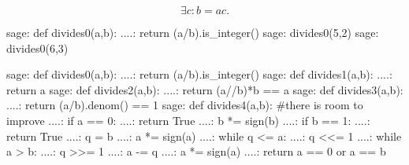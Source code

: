 \begin{definition}[\Wrap{content/magyar=Osztó, content/english=Divisor}]
  \[ \exists c: b = ac.\]
\end{definition}

\begin{exercise}
  \begin{sageexample}
    sage: def divides0(a,b):
    ....:     return (a/b).is_integer()
    sage: divides0(5,2)
    sage: divides0(6,3)
  \end{sageexample}

  \begin{solution}
    \begin{sageexample}
        sage: def divides0(a,b):
        ....:     return (a/b).is_integer()
        sage: def divides1(a,b):
        ....:     return a %
        sage: def divides2(a,b):
        ....:     return (a//b)*b == a
        sage: def divides3(a,b):
        ....:     return (a/b).denom() == 1
        sage: def divides4(a,b): #there is room to improve
        ....:     if a == 0:
        ....:         return True
        ....:     b *= sign(b)
        ....:     if b == 1:
        ....:         return True
        ....:     q = b
        ....:     a *= sign(a)
        ....:     while q <= a:
        ....:         q <<= 1
        ....:     while a > b:
        ....:         q >>= 1
        ....:         a -= q
        ....:         a *= sign(a)
        ....:     return a == 0 or a == b

      \end{sageexample}
  \end{solution}
\end{exercise}

